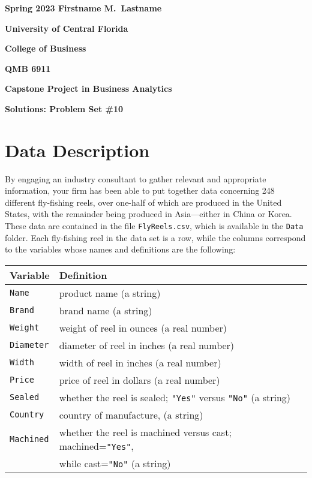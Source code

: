 \documentclass[11pt]{paper}
\begin{document}

\pagestyle{empty}
{\noindent\bf Spring 2023 \hfill Firstname M.~Lastname}
\vskip 16pt
\centerline{\bf University of Central Florida}
\centerline{\bf College of Business}
\vskip 16pt
\centerline{\bf QMB 6911}
\centerline{\bf Capstone Project in Business Analytics}
\vskip 10pt
\centerline{\bf Solutions:  Problem Set \#10}
\vskip 32pt
\noindent
% 
% 
\section{Data Description}
% 
By engaging an industry consultant to gather relevant and appropriate 
information, your firm has been able to put together data concerning 248 
different fly-fishing reels, over one-half of which are produced in the 
United States, with the remainder being produced in Asia---either in China 
or Korea.  These data are contained in the file {\tt FlyReels.csv}, which is
available in the {\tt Data} folder.
Each fly-fishing reel in the data set is a row, while the columns correspond 
to the variables whose names and definitions are the following:
\bigskip
\begin{table}[ht]
\centering
\begin{tabular}{ll}
  \hline
    Variable & Definition \\
  \hline

    {\tt Name}        &product name (a string) \\ 
    {\tt Brand}       &brand name (a string) \\ 
    {\tt Weight}      &weight of reel in ounces (a real number) \\ 
    {\tt Diameter}    &diameter of reel in inches (a real number) \\ 
    {\tt Width}       &width of reel in inches (a real number) \\ 
    {\tt Price}       &price of reel in dollars (a real number) \\ 
    {\tt Sealed}      &whether the reel is sealed; {\tt "Yes"} versus
                        {\tt "No"} (a string) \\ 
    {\tt Country}     &country of manufacture, (a string) \\ 
    {\tt Machined}    &whether the reel is machined versus cast;
                        machined={\tt "Yes"}, \\ 
                      &while cast={\tt "No"} (a string) \\ 
  \hline
\end{tabular}
\end{table}
\end{document}
